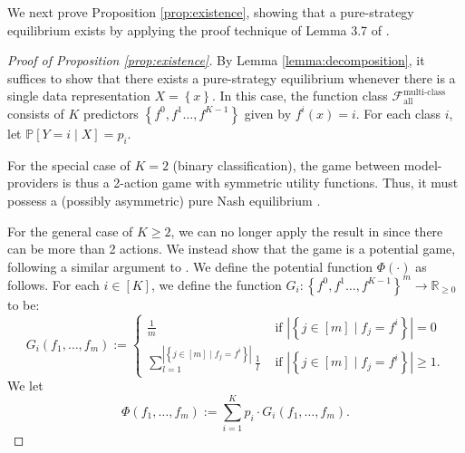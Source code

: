 \documentclass[letterpaper,11pt]{article}
\theoremstyle{plain}
\begin{document}
We next prove Proposition \ref{prop:existence}, showing that a pure-strategy equilibrium exists by applying the proof technique of Lemma 3.7 of \citet{BT19}. 
\begin{proof}[Proof of Proposition \ref{prop:existence}]
By Lemma \ref{lemma:decomposition}, it suffices to show that there exists a pure-strategy equilibrium whenever there is a single data representation $X = \left\{x\right\}$. In this case, the function class $\mathcal{F}^{\text{multi-class}}_{\text{all}}$ consists of $K$ predictors $\left\{f^0, f^1 \ldots, f^{K-1}\right\}$ given by $f^i(x) = i$. For each class $i$, let $\mathbb{P}[Y = i \mid X] = p_i$. 

For the special case of $K = 2$ (binary classification), the game between model-providers is thus a 2-action game with symmetric utility functions. Thus, it must possess a (possibly asymmetric) pure Nash equilibrium \citep{C04}. 

For the general case of $K \ge 2$, we can no longer apply the result in \citep{C04} since there can be more than 2 actions. We instead show that the game is a potential game, following a similar argument to \citet{BT19}. We define the potential function $\Phi(\cdot)$ as follows. For each $i \in [K]$, we define the function $G_i: \left\{f^0, f^1 \ldots, f^{K-1}\right\}^m \rightarrow \mathbb{R}_{\ge 0}$ to be:
\[
G_i(f_1, \ldots, f_m) := 
\begin{cases}
 \frac{1}{m}  &\text{ if } |\left\{j \in [m] \mid f_j = f^i\right\}| = 0 \\
  \sum_{l=1}^{|\left\{j \in [m] \mid f_j = f^i\right\}| } \frac{1}{l}  &\text{ if } |\left\{j \in [m] \mid f_j = f^i\right\}| \ge 1.
\end{cases}
\]
 We let 
\[\Phi(f_1, \ldots, f_m) := \sum_{i=1}^K p_i \cdot G_i(f_1, \ldots, f_m).\]


\end{proof}
\end{document}
